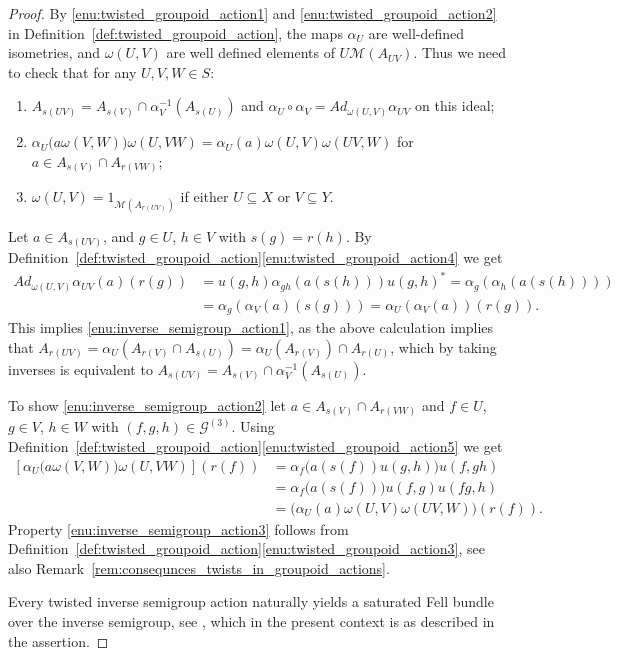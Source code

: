 \documentclass[11 pt, leqno]{amsart}
\numberwithin{equation}{section}
\theoremstyle{plain}
\theoremstyle{definition}
\newcommand{\M}{\mathcal M}
\newcommand{\G}{\mathcal G} %
\begin{document}
\begin{proof} 
By \ref{enu:twisted_groupoid_action1} and \ref{enu:twisted_groupoid_action2} in Definition~\ref{def:twisted_groupoid_action}, the maps $\alpha_{U}$ are well-defined isometries, and $\omega(U, V)$ are well defined elements of $U\M(A_{UV})$. 
Thus we need to check that for any $U,V,W \in S$: 
\begin{enumerate}[(T1)]
    \item\label{enu:inverse_semigroup_action1} $A_{s(UV)} = A_{s(V)} \cap \alpha_V^{-1}(A_{s(U)})$ and  \(\alpha_U\circ \alpha_V= Ad_{\omega(U,V)}\alpha_{UV}\) on this ideal; 
    \item\label{enu:inverse_semigroup_action2}  \(\alpha_U\big(a \omega(V,W)\big) \omega(U,V W) = \alpha_U(a)\omega(U,V)\omega(UV,W)\) for \(a\in A_{s(V)}\cap
    A_{r(VW)}\); 
    \item\label{enu:inverse_semigroup_action3} \(\omega(U,V) = 1_{\M(A_{r(UV)})}\) if either $U\subseteq X$ or $V\subseteq Y$.
\end{enumerate}
Let $a\in A_{s(UV)}$, and $g\in U$, $h\in V$ with $s(g)=r(h)$. 
By Definition~\ref{def:twisted_groupoid_action}\ref{enu:twisted_groupoid_action4} we get 
\[
\begin{split}
	Ad_{\omega(U,V)}\alpha_{UV}(a)(r(g)) &=u(g,h) \alpha_{gh}(a(s(h))) u(g,h)^*=\alpha_{g}(\alpha_h(a(s(h))))
	\\
	&=\alpha_{g}(\alpha_V(a)(s(g)))=\alpha_U (\alpha_V(a))(r(g)) . 
\end{split}
\]
This implies \ref{enu:inverse_semigroup_action1}, as the above calculation implies that $A_{r(UV)}=\alpha_U(A_{r(V)}\cap A_{s(U)})=\alpha_U(A_{r(V)})\cap A_{r(U)}$, which by taking inverses is equivalent to $A_{s(UV)} = A_{s(V)} \cap \alpha_V^{-1}(A_{s(U)})$.

To show \ref{enu:inverse_semigroup_action2} let \(a\in A_{s(V)} \cap A_{r(VW)}\) and $f\in U$, $g\in V$, $h\in W$ with $(f,g,h)\in \G^{(3)}$.
Using Definition~\ref{def:twisted_groupoid_action}\ref{enu:twisted_groupoid_action5} we get 
\[
\begin{split}
    [\alpha_U\big(a \omega(V,W)\big) \omega(U,V W)] (r(f)) &=\alpha_{f}\Big(a(s(f))  u( g,h)\Big) u(f,gh) \\
        &= \alpha_{f}\Big(a(s(f))\Big) u(f,g)u(fg,h) \\
        &= \big( \alpha_U(a)\omega(U,V)\omega(UV,W) \big) (r(f)).
\end{split}
\]
Property \ref{enu:inverse_semigroup_action3} follows from Definition~\ref{def:twisted_groupoid_action}\ref{enu:twisted_groupoid_action3}, 
see also Remark~\ref{rem:consequnces_twists_in_groupoid_actions}.

Every twisted inverse semigroup action naturally yields a saturated Fell bundle over the inverse semigroup, see \cite[page 250]{BussExel0}, which in the present context is as described in the assertion.
\end{proof}
\end{document}
